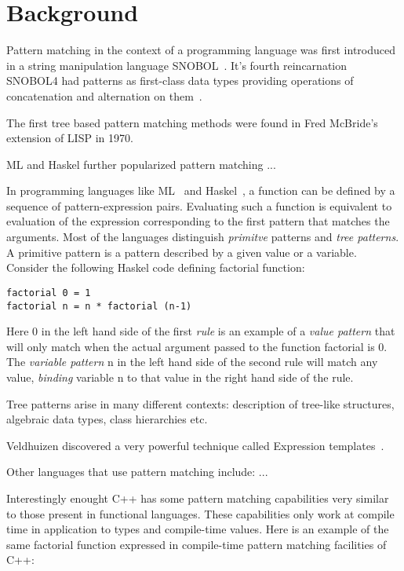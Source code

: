 \documentclass[submission,copyright]{eptcs}
\begin{document}
\section{Background} %
\label{sec:bg}

Pattern matching in the context of a programming language was first introduced 
in a string manipulation language SNOBOL~\cite{SNOBOL64}. It's fourth 
reincarnation SNOBOL4 had patterns as first-class data types providing 
operations of concatenation and alternation on them~\cite{SNOBOL71}.

The first tree based pattern matching methods were found in Fred McBride's 
extension of LISP in 1970.

ML and Haskel further popularized pattern matching ...

In programming languages like ML~\cite{ML90} and Haskel~\cite{Haskell98Book}, a 
function can be defined by a sequence of pattern-expression pairs. Evaluating 
such a function is equivalent to evaluation of the expression corresponding to 
the first pattern that matches the arguments. Most of the languages distinguish 
\emph{primitve} patterns and \emph{tree patterns}. A primitive pattern is a 
pattern described by a given value or a variable. Consider the following Haskel 
code defining factorial function: 

\begin{lstlisting}
factorial 0 = 1
factorial n = n * factorial (n-1)
\end{lstlisting}

Here 0 in the left hand side of the first \emph{rule} is an example of a 
\emph{value pattern} that will only match when the actual argument passed to the 
function factorial is 0. The \emph{variable pattern} n in the left hand side of 
the second rule will match any value, \emph{binding} variable n to that value in 
the right hand side of the rule.

Tree patterns arise in many different contexts: description of tree-like 
structures, algebraic data types, class hierarchies etc.

Veldhuizen discovered a very powerful technique called Expression 
templates~\cite{Veldhuizen95expressiontemplates}.

Other languages that use pattern matching include: ...

Interestingly enought C++ has some pattern matching capabilities very similar to 
those present in functional languages. These capabilities only work at compile 
time in application to types and compile-time values. Here is an example of the 
same factorial function expressed in compile-time pattern matching facilities of 
C++:
\end{document}
